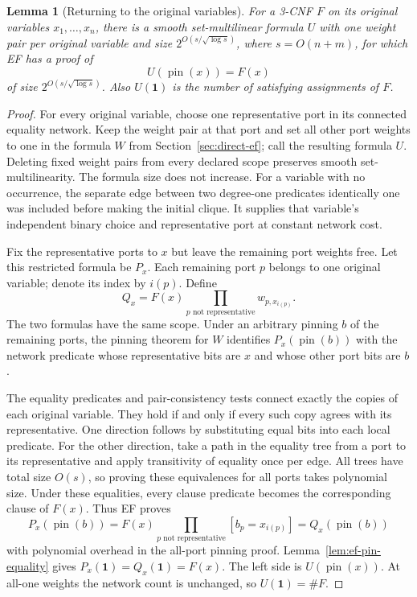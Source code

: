 \documentclass[11pt]{article}
\newtheorem{lemma}[theorem]{Lemma}
\theoremstyle{definition}
\theoremstyle{remark}
\begin{document}
\begin{lemma}[Returning to the original variables]
\label{lem:original-weight-pinning}
For a 3-CNF $F$ on its original variables $x_1,\ldots,x_n$, there is
a smooth set-multilinear formula $U$ with one weight pair per original
variable and size $2^{O(s/\sqrt{\log s})}$, where $s=O(n+m)$, for which
EF has a proof of
\[
 U(\operatorname{pin}(x))=F(x)
\]
of size $2^{O(s/\sqrt{\log s})}$. Also $U(\mathbf1)$ is the number
of satisfying assignments of $F$.
\end{lemma}
\begin{proof}
For every original variable, choose one representative port in its
connected equality network. Keep the weight pair at that port and
set all other port weights to one in the formula $W$ from
Section~\ref{sec:direct-ef}; call the resulting formula $U$.
Deleting fixed weight pairs from every declared scope preserves
smooth set-multilinearity. The formula size does not increase.
For a variable with no occurrence, the separate edge between two
degree-one predicates identically one was included before making
the initial clique. It supplies that variable's independent binary
choice and representative port at constant network cost.

Fix the representative ports to $x$ but leave the remaining port
weights free. Let this restricted formula be $P_x$. Each remaining
port $p$ belongs to one original variable; denote its index by
$i(p)$. Define
\[
 Q_x=F(x)\prod_{p\text{ not representative}}w_{p,x_{i(p)}}.
\]
The two formulas have the same scope. Under an arbitrary pinning
$b$ of the remaining ports, the pinning theorem for $W$ identifies
$P_x(\operatorname{pin}(b))$ with the network predicate whose
representative bits are $x$ and whose other port bits are $b$.

The equality predicates and pair-consistency tests connect exactly
the copies of each original variable. They hold if and only if every
such copy agrees with its representative. One direction follows by
substituting equal bits into each local predicate. For the other
direction, take a path in the equality tree from a port to its
representative and apply transitivity of equality once per edge.
All trees have total size $O(s)$, so proving these equivalences for
all ports takes polynomial size. Under these equalities, every clause
predicate becomes the corresponding clause of $F(x)$. Thus EF proves
\[
 P_x(\operatorname{pin}(b))
 =F(x)\prod_{p\text{ not representative}}[b_p=x_{i(p)}]
 =Q_x(\operatorname{pin}(b))
\]
with polynomial overhead in the all-port pinning proof.
Lemma~\ref{lem:ef-pin-equality} gives
$P_x(\mathbf1)=Q_x(\mathbf1)=F(x)$. The left side is
$U(\operatorname{pin}(x))$. At all-one weights the network count
is unchanged, so $U(\mathbf1)=\#F$.
\end{proof}
\end{document}

